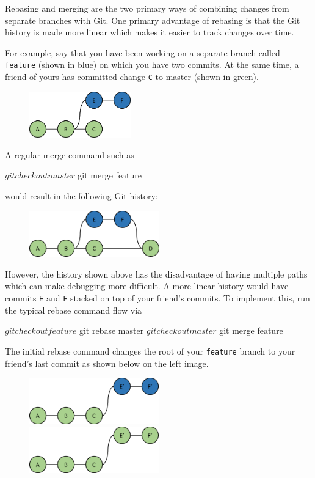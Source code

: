 \documentclass[12pt]{report}
\begin{document}
Rebasing and merging are the two primary ways of combining changes from separate branches with Git.  One primary advantage of rebasing is that the Git history is made more linear which makes it easier to track changes over time.

For example, say that you have been working on a separate branch called \texttt{feature} (shown in blue) on which you have two commits.  At the same time, a friend of yours has committed change \texttt{C} to master (shown in green).

\begin{figure}[H]
\center
\includegraphics[height=2cm]{feature}
\end{figure}

A regular merge command such as
\begin{blockcode}
$ git checkout master
$ git merge feature
\end{blockcode}
would result in the following Git history:
\begin{figure}[h]
\center
\includegraphics[height=2cm]{merge}
\end{figure}

However, the history shown above has the disadvantage of having multiple paths which can make debugging more difficult.  A more linear history would have commits \texttt{E} and \texttt{F} stacked on top of your friend's commits.  To implement this, run the typical rebase command flow via
\begin{blockcode}
$ git checkout feature
$ git rebase master
$ git checkout master
$ git merge feature
\end{blockcode}

The initial rebase command changes the root of your \texttt{feature} branch to your friend's last commit as shown below on the left image.

\begin{figure}[h]
\center
\includegraphics[height=2cm]{rebase}
\includegraphics[height=2cm]{rebase_merge}
\end{figure}
\end{document}
